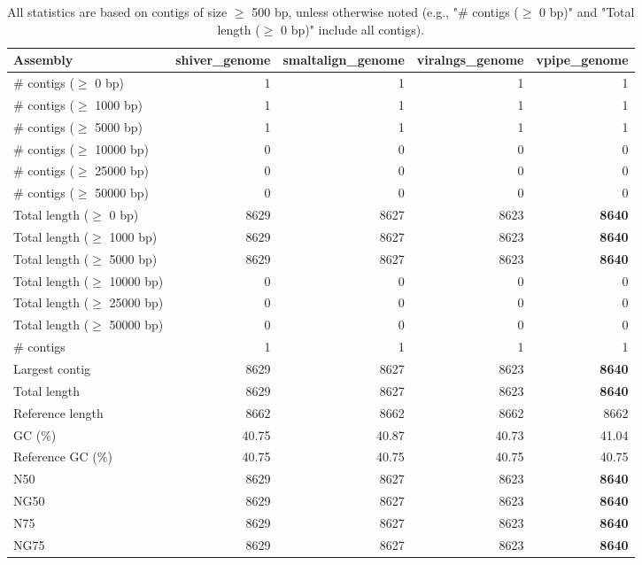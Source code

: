 \documentclass[12pt,a4paper]{article}
\begin{document}
\begin{table}[ht]
\begin{center}
\caption{All statistics are based on contigs of size $\geq$ 500 bp, unless otherwise noted (e.g., "\# contigs ($\geq$ 0 bp)" and "Total length ($\geq$ 0 bp)" include all contigs).}
\begin{tabular}{|l*{4}{|r}|}
\hline
Assembly & shiver\_genome & smaltalign\_genome & viralngs\_genome & vpipe\_genome \\ \hline
\# contigs ($\geq$ 0 bp) & 1 & 1 & 1 & 1 \\ \hline
\# contigs ($\geq$ 1000 bp) & 1 & 1 & 1 & 1 \\ \hline
\# contigs ($\geq$ 5000 bp) & 1 & 1 & 1 & 1 \\ \hline
\# contigs ($\geq$ 10000 bp) & 0 & 0 & 0 & 0 \\ \hline
\# contigs ($\geq$ 25000 bp) & 0 & 0 & 0 & 0 \\ \hline
\# contigs ($\geq$ 50000 bp) & 0 & 0 & 0 & 0 \\ \hline
Total length ($\geq$ 0 bp) & 8629 & 8627 & 8623 & {\bf 8640} \\ \hline
Total length ($\geq$ 1000 bp) & 8629 & 8627 & 8623 & {\bf 8640} \\ \hline
Total length ($\geq$ 5000 bp) & 8629 & 8627 & 8623 & {\bf 8640} \\ \hline
Total length ($\geq$ 10000 bp) & 0 & 0 & 0 & 0 \\ \hline
Total length ($\geq$ 25000 bp) & 0 & 0 & 0 & 0 \\ \hline
Total length ($\geq$ 50000 bp) & 0 & 0 & 0 & 0 \\ \hline
\# contigs & 1 & 1 & 1 & 1 \\ \hline
Largest contig & 8629 & 8627 & 8623 & {\bf 8640} \\ \hline
Total length & 8629 & 8627 & 8623 & {\bf 8640} \\ \hline
Reference length & 8662 & 8662 & 8662 & 8662 \\ \hline
GC (\%) & 40.75 & 40.87 & 40.73 & 41.04 \\ \hline
Reference GC (\%) & 40.75 & 40.75 & 40.75 & 40.75 \\ \hline
N50 & 8629 & 8627 & 8623 & {\bf 8640} \\ \hline
NG50 & 8629 & 8627 & 8623 & {\bf 8640} \\ \hline
N75 & 8629 & 8627 & 8623 & {\bf 8640} \\ \hline
NG75 & 8629 & 8627 & 8623 & {\bf 8640} \\ \hline

\end{tabular}
\end{center}
\end{table}
\end{document}
